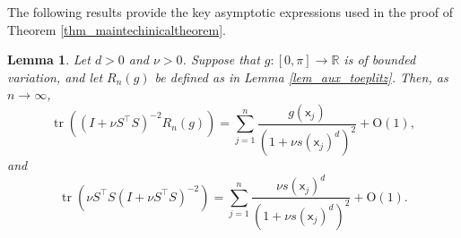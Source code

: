 \documentclass[11pt]{article}
\newtheorem{lemma}[theorem]{Lemma}
\newcommand{\sfx}{\mathsf{x}}
\numberwithin{equation}{section}
\numberwithin{figure}{section}
\begin{document}
The following results provide the key asymptotic expressions used in the proof of Theorem \ref{thm_maintechinicaltheorem}.
\begin{lemma}\label{thm_aux_trace_approx}
Let \(d>0\) and \(\nu>0\). Suppose that \(g:[0,\pi]\to\mathbb{R}\) is of bounded variation, and let \(R_n(g)\) be defined as in Lemma \ref{lem_aux_toeplitz}. Then, as \(n\to\infty\),
\begin{equation*}
\operatorname{tr}\!\left(
(I+\nu S^\top S)^{-2}R_n(g)
\right)
=
\sum_{j=1}^{n}
\frac{g(\sfx_j)}
{(1+\nu s(\sfx_j)^d)^{2}}
+
\mathrm{O}(1),
\end{equation*}
and
\begin{equation*}
\operatorname{tr}\!\left(
\nu S^\top S
(I+\nu S^\top S)^{-2}
\right)
=
\sum_{j=1}^{n}
\frac{\nu s(\sfx_j)^d}
{(1+\nu s(\sfx_j)^d)^{2}}
+
\mathrm{O}(1).
\end{equation*}
\end{lemma}
\end{document}
